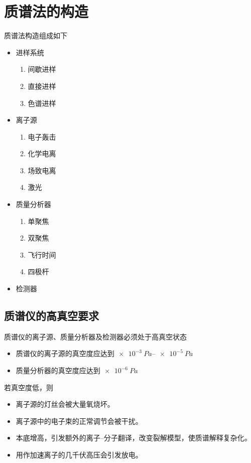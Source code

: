 \section{质谱法的构造}
质谱法构造组成如下
\begin{itemize}
    \item 进样系统
    \begin{enumerate}
        \item 间歇进样
        \item 直接进样
        \item 色谱进样
    \end{enumerate}
    \item 离子源
    \begin{enumerate}
        \item 电子轰击
        \item 化学电离
        \item 场致电离
        \item 激光
    \end{enumerate}
    \item 质量分析器
    \begin{enumerate}
        \item 单聚焦
        \item 双聚焦
        \item 飞行时间
        \item 四极杆
    \end{enumerate}
    \item 检测器
\end{itemize}

\subsection{质谱仪的高真空要求}
质谱仪的离子源、质量分析器及检测器必须处于高真空状态
\begin{itemize}
    \item 质谱仪的离子源的真空度应达到$\SIrange{e-3}{e-5}{Pa}$
    \item 质量分析器的真空度应达到$\SI{e-6}{Pa}$
\end{itemize}
若真空度低，则
\begin{itemize}
    \item 离子源的灯丝会被大量氧烧坏。
    \item 离子源中的电子束的正常调节会被干扰。
    \item 本底增高，引发额外的离子--分子翻译，改变裂解模型，使质谱解释复杂化。
    \item 用作加速离子的几千伏高压会引发放电。
\end{itemize}

